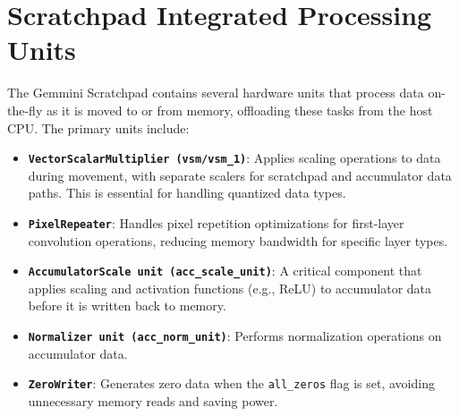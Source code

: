 \section{Scratchpad Integrated Processing Units}
\label{app:scratchpad_units}

The Gemmini Scratchpad contains several hardware units that process data on-the-fly as it is moved to or from memory, offloading these tasks from the host CPU. The primary units include:

\begin{itemize}
    \item \textbf{\texttt{VectorScalarMultiplier (vsm/vsm\_1)}}: Applies scaling operations to data during movement, with separate scalers for scratchpad and accumulator data paths. This is essential for handling quantized data types.
    
    \item \textbf{\texttt{PixelRepeater}}: Handles pixel repetition optimizations for first-layer convolution operations, reducing memory bandwidth for specific layer types.
    
    \item \textbf{\texttt{AccumulatorScale unit (acc\_scale\_unit)}}: A critical component that applies scaling and activation functions (e.g., ReLU) to accumulator data before it is written back to memory.
    
    \item \textbf{\texttt{Normalizer unit (acc\_norm\_unit)}}: Performs normalization operations on accumulator data.
    
    \item \textbf{\texttt{ZeroWriter}}: Generates zero data when the \texttt{all\_zeros} flag is set, avoiding unnecessary memory reads and saving power.
\end{itemize}
